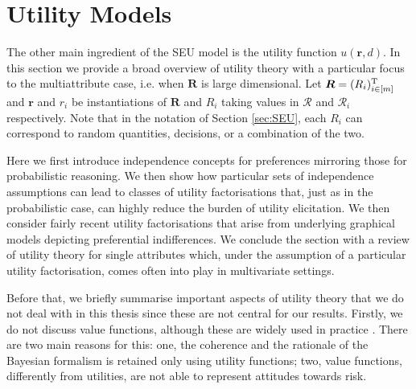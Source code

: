 \section{Utility Models}
\label{sec:ut}
The other main ingredient of the SEU model is the utility function $u(\bm{r},d)$. In this section we provide a broad overview of utility theory with a particular focus to the multiattribute case, i.e. when $\bm{R}$ is large dimensional. Let $\bm{R}=(R_i)_{i\in[m]}^{\textnormal{T}}$ and $\bm{r}$ and $r_i$ be instantiations of $\bm{R}$ and $R_i$  taking values in $\bm{\mathcal{R}}$ and $\mathcal{R}_i$ respectively. Note that in the notation of Section \ref{sec:SEU}, each $R_i$ can correspond to random quantities, decisions, or a combination of the two. 

 Here we first introduce independence concepts for preferences mirroring those for probabilistic reasoning. We  then show how particular sets of independence assumptions can lead to classes of utility factorisations that, just as in the probabilistic case, can highly reduce the burden of utility elicitation. We then consider fairly recent utility factorisations that arise from underlying graphical models depicting preferential indifferences. We conclude the section with a review of utility theory for single attributes which, under the assumption of a particular utility factorisation, comes often into play in multivariate settings. 

Before that, we  briefly summarise important aspects of utility theory that we do not deal with in this thesis since these are not central for our results. Firstly, we do not discuss value functions, although these are widely used in practice \citep{Belton2002,Keeney1993a}. There are two main reasons for this: one, the coherence and the rationale of the Bayesian formalism is retained only using utility functions; two, value functions, differently from utilities, are not able to represent attitudes towards risk. 

